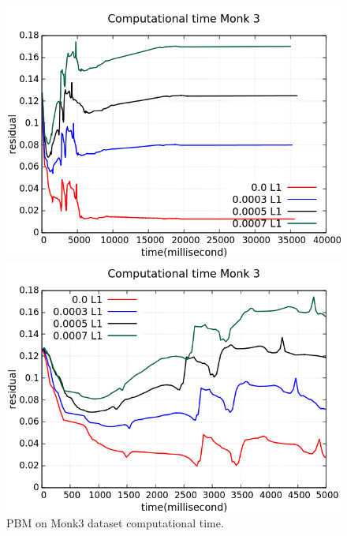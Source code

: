 \begin{figure}[H]
	\centering
	\begin{minipage}[t]{0.5\linewidth}
		\includegraphics[width=\linewidth]{data/PBM/Monk3/Monk3_PBM_CT_standard.png}
	\end{minipage}%
	\begin{minipage}[t]{0.5\linewidth}
		\includegraphics[width=\linewidth]{data/PBM/Monk3/Monk3_PBM_CT_zoom.png}
	\end{minipage}
	\caption{PBM on Monk3 dataset computational time.}
\end{figure}

